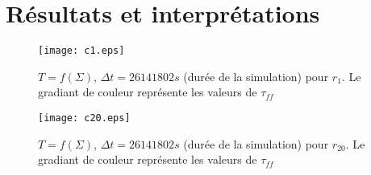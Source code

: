 \section{Résultats et interprétations}

\begin{figure}
  \begin{center}
    \texttt{[image: c1.eps]}
  \end{center}
  \caption{$T=f(\Sigma)$, $\Delta t = 26141802 s$ (durée de la simulation) pour $r_{1}$. Le gradiant de couleur représente les valeurs de $\tau_{ff}$}
  \label{fig:c1.eps}
\end{figure} 

\begin{figure}
  \begin{center}
    \texttt{[image: c20.eps]}
  \end{center}
  \caption{$T=f(\Sigma)$, $\Delta t = 26141802 s$ (durée de la simulation) pour $r_{20}$. Le gradiant de couleur représente les valeurs de $\tau_{ff}$}
  \label{fig:c20.eps}
\end{figure} 